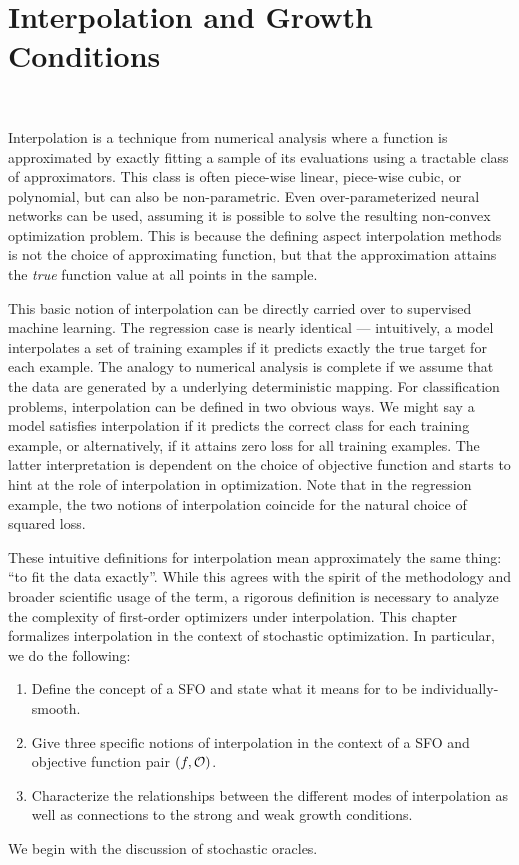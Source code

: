 
\chapter{Interpolation and Growth Conditions}~\label{ch:interpolation-gc}

Interpolation is a technique from numerical analysis where a function is approximated by exactly fitting a sample of its evaluations using a tractable class of approximators. 
This class is often piece-wise linear, piece-wise cubic, or polynomial, but can also be non-parametric. 
Even over-parameterized neural networks can be used, assuming it is possible to solve the resulting non-convex optimization problem. 
This is because the defining aspect interpolation methods is not the choice of approximating function, but that the approximation attains the \emph{true} function value at all points in the sample.


This basic notion of interpolation can be directly carried over to supervised machine learning.  
The regression case is nearly identical --- intuitively, a model interpolates a set of training examples if it predicts exactly the true target for each example. 
The analogy to numerical analysis is complete if we assume that the data are generated by a underlying deterministic mapping.
For classification problems, interpolation can be defined in two obvious ways. 
We might say a model satisfies interpolation if it predicts the correct class for each training example, or alternatively, if it attains zero loss for all training examples.  
The latter interpretation is dependent on the choice of objective function and starts to hint at the role of interpolation in optimization.
Note that in the regression example, the two notions of interpolation coincide for the natural choice of squared loss.

These intuitive definitions for interpolation mean approximately the same thing: ``to fit the data exactly''. 
While this agrees with the spirit of the methodology and broader scientific usage of the term, a rigorous definition is necessary to analyze the complexity of first-order optimizers under interpolation. 
This chapter formalizes interpolation in the context of stochastic optimization. 
In particular, we do the following:
\begin{enumerate}
    \item Define the concept of a \acl{SFO} \oracle{} and state what it means for \oracle{} to be individually-smooth. 
    \item Give three specific notions of interpolation in the context of a \acl{SFO} and objective function pair \( \rbr{f, \oracle{}} \).
    \item Characterize the relationships between the different modes of interpolation as well as connections to the strong and weak growth conditions. 
\end{enumerate}
We begin with the discussion of stochastic oracles.

